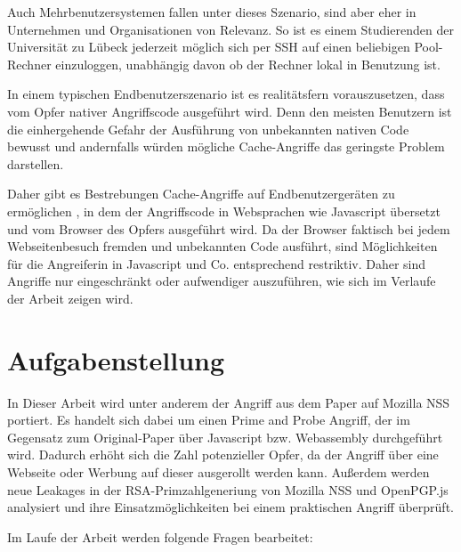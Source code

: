 Auch Mehrbenutzersystemen fallen unter dieses Szenario, sind aber eher in Unternehmen und Organisationen von Relevanz.
So ist es einem Studierenden der Universität zu Lübeck jederzeit möglich sich per SSH auf einen beliebigen Pool-Rechner einzuloggen, unabhängig davon ob der Rechner lokal in Benutzung ist.

In einem typischen Endbenutzerszenario ist es realitätsfern vorauszusetzen, dass vom Opfer nativer Angriffscode ausgeführt wird.
Denn den meisten Benutzern ist die einhergehende Gefahr der Ausführung von unbekannten nativen Code bewusst und andernfalls würden mögliche Cache-Angriffe das geringste Problem darstellen.

Daher gibt es Bestrebungen Cache-Angriffe auf Endbenutzergeräten zu ermöglichen \cite{TheSpyInTheSandbox,DriveByPaper,ASLROnTheLine}, in dem der Angriffscode in Websprachen wie Javascript übersetzt und vom Browser des Opfers ausgeführt wird.
Da der Browser faktisch bei jedem Webseitenbesuch fremden und unbekannten Code ausführt, sind Möglichkeiten für die Angreiferin in Javascript und Co. entsprechend restriktiv.
Daher sind Angriffe nur eingeschränkt oder aufwendiger auszuführen, wie sich im Verlaufe der Arbeit zeigen wird. 

\section{Aufgabenstellung}


In Dieser Arbeit wird unter anderem der Angriff aus dem Paper \cite{RSAKeyGeneration2} auf Mozilla NSS portiert. Es handelt sich dabei um einen Prime and Probe Angriff, der im Gegensatz zum Original-Paper über Javascript bzw. Webassembly durchgeführt wird. Dadurch erhöht sich die Zahl potenzieller Opfer, da der Angriff über eine Webseite oder Werbung auf dieser ausgerollt werden kann.
Außerdem werden neue Leakages in der RSA-Primzahlgeneriung von Mozilla NSS und OpenPGP.js analysiert und ihre Einsatzmöglichkeiten bei einem praktischen Angriff überprüft.


Im Laufe der Arbeit werden folgende Fragen bearbeitet:

